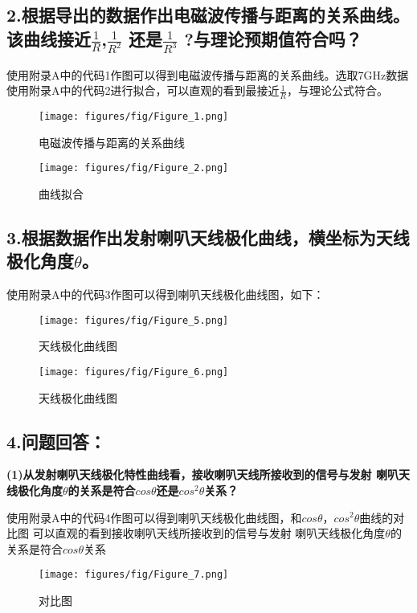 \documentclass[12pt,hyperref,a4paper,UTF8]{ctexart}
\begin{document}
\subsection*{2.根据导出的数据作出电磁波传播与距离的关系曲线。该曲线接近$\frac1R$,$\frac1{R^2}$
还是$\frac{1}{R^3}$ ?与理论预期值符合吗？}

使用附录A中的代码1作图可以得到电磁波传播与距离的关系曲线。选取7GHz数据使用附录A中的代码2进行拟合，可以直观的看到最接近$\frac1R$，与理论公式符合。

\begin{figure}[H]
    \centering
    \texttt{[image: figures/fig/Figure\_1.png]}
    \caption{电磁波传播与距离的关系曲线}
\end{figure}

\begin{figure}[H]
    \centering
    \texttt{[image: figures/fig/Figure\_2.png]}
    \caption{曲线拟合}
\end{figure}

\subsection*{3.根据数据作出发射喇叭天线极化曲线，横坐标为天线极化角度$\theta$。}

使用附录A中的代码3作图可以得到喇叭天线极化曲线图，如下：

\begin{figure}[H]
    \centering
    \texttt{[image: figures/fig/Figure\_5.png]}
    \caption{天线极化曲线图}
\end{figure}

\begin{figure}[H]
    \centering
    \texttt{[image: figures/fig/Figure\_6.png]}
    \caption{天线极化曲线图}
\end{figure}


\subsection*{4.问题回答：}
\textbf{(1)从发射喇叭天线极化特性曲线看，接收喇叭天线所接收到的信号与发射
喇叭天线极化角度$\theta$的关系是符合$cos\theta$还是$cos^2\theta$关系？
}

使用附录A中的代码4作图可以得到喇叭天线极化曲线图，和$cos\theta$，$cos^2\theta$曲线的对比图
可以直观的看到接收喇叭天线所接收到的信号与发射
喇叭天线极化角度$\theta$的关系是符合$cos\theta$关系

\begin{figure}[H]
    \centering
    \texttt{[image: figures/fig/Figure\_7.png]}
    \caption{对比图}
\end{figure}
\end{document}
